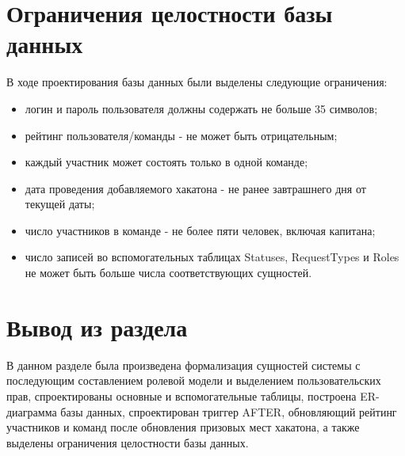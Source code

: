 \section{Ограничения целостности базы данных}
В ходе проектирования базы данных были выделены следующие ограничения: 
\begin{itemize}
    \item логин и пароль пользователя должны содержать не больше 35 символов;
    \item рейтинг пользователя/команды - не может быть отрицательным;
    \item каждый участник может состоять только в одной команде;
    \item дата проведения добавляемого хакатона - не ранее завтрашнего дня от текущей даты;
    \item число участников в команде - не более пяти человек, включая капитана;
    \item число записей во вспомогательных таблицах Statuses, RequestTypes и Roles не может быть больше числа соответствующих сущностей.
\end{itemize}

\section{Вывод из раздела}

В данном разделе была произведена формализация сущностей системы с последующим составлением ролевой модели и выделением пользовательских прав, спроектированы основные и вспомогательные таблицы, построена ER-диаграмма базы данных, спроектирован триггер AFTER, обновляющий рейтинг участников и команд после обновления призовых мест хакатона, а также выделены ограничения целостности базы данных.